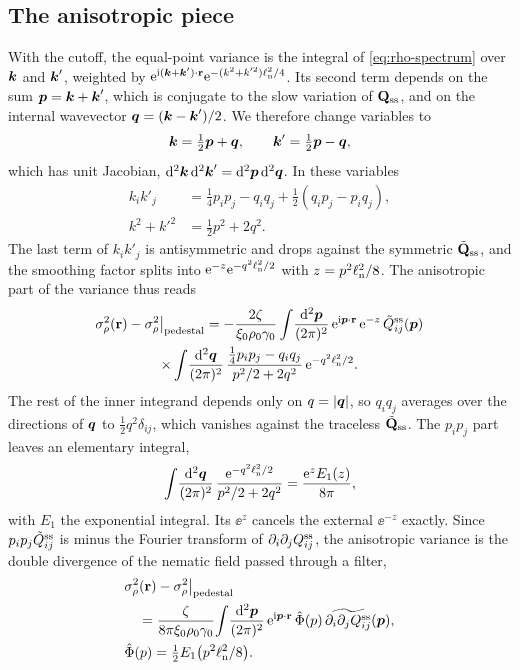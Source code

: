 \documentclass[aps,pre,reprint,superscriptaddress,longbibliography,nofootinbib
]{revtex4-2}
\begin{document}
\subsection{The anisotropic piece}
\label{app:variance-aniso}
With the cutoff, the equal-point variance is the integral
of \cref{eq:rho-spectrum} over $\k$ and $\k'$, weighted by
$\ee^{\ii(\k+\k')\cdot\r}\ee^{-(k^2+k'^2)\elln^2/4}$. Its
second term depends on the sum $\bs p=\k+\k'$, which is
conjugate to the slow variation of $\Q_\ss$, and on the
internal wavevector $\bs q=(\k-\k')/2$. We therefore change
variables to
\begin{equation}
  \k=\tfrac12\bs p+\bs q,\qquad\k'=\tfrac12\bs p-\bs q,
\end{equation}
which has unit Jacobian, $\d^2\k\,\d^2\k'=\d^2\bs
p\,\d^2\bs q$. In these variables
\begin{align}
  k_ik'_j&=\tfrac14p_ip_j-q_iq_j+\tfrac12(q_ip_j-p_iq_j),
  \nonumber\\
  k^2+k'^2&=\tfrac12p^2+2q^2 .
\end{align}
The last term of $k_ik'_j$ is antisymmetric and drops
against the symmetric $\tilde\Q_\ss$, and the smoothing
factor splits into $\ee^{-z}\ee^{-q^2\elln^2/2}$ with
$z=p^2\elln^2/8$. The anisotropic part of the variance thus
reads
\begin{multline}
  \label{eq:aniso-pq}
  \sigmarho(\r)-\sigmarho\big|_\text{pedestal}
  =-\frac{2\zeta}{\xi_0\rho_0\gamma_0}\int\!\frac{\d^2\bs p}{(2\pi)^2}\,\ee^{\ii\bs p\cdot\r}\,
  \ee^{-z}\,\tilde Q^\ss_{ij}(\bs p)
  \\
  \times\int\!\frac{\d^2\bs q}{(2\pi)^2}\,
  \frac{\tfrac14p_ip_j-q_iq_j}{p^2/2+2q^2}\,\ee^{-q^2\elln^2/2}.
\end{multline}
The rest of the inner integrand depends only on $q=|\bs
q|$, so $q_iq_j$ averages over the directions of $\bs q$ to
$\tfrac12q^2\delta_{ij}$, which vanishes against the
traceless $\tilde\Q_\ss$. The $p_ip_j$ part leaves an
elementary integral,
\begin{equation}
  \label{eq:aniso-inner}
  \int\!\frac{\d^2\bs q}{(2\pi)^2}\,\frac{\ee^{-q^2\elln^2/2}}{p^2/2+2q^2}
  =\frac{\ee^{z}E_1(z)}{8\pi},
\end{equation}
with $E_1$ the exponential integral. Its $\ee^{z}$ cancels
the external $\ee^{-z}$ exactly. Since $p_ip_j\tilde
Q^\ss_{ij}$ is minus the Fourier transform of
$\partial_i\partial_jQ^\ss_{ij}$, the anisotropic variance
is the double divergence of the nematic field passed
through a filter,
\begin{align}
  \label{eq:aniso-kernel}
  &\sigmarho(\r)-\sigmarho\big|_\text{pedestal}
  \nonumber\\
  &\quad=\frac{\zeta}{8\pi\xi_0\rho_0\gamma_0}\!\int\!\frac{\d^2\bs p}{(2\pi)^2}\,
  \ee^{\ii\bs p\cdot\r}\,\hat\Phi(p)\,\widetilde{\partial_i\partial_jQ^\ss_{ij}}(\bs p),
  \nonumber\\
  &\hat\Phi(p)=\tfrac12E_1\bigl(p^2\elln^2/8\bigr).
\end{align}
\end{document}
